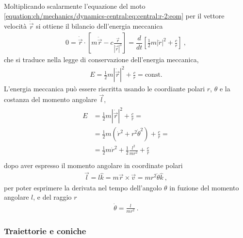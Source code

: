 \documentclass[letterpaper,10pt,italian]{jupyterBook}
\begin{document}
\sphinxAtStartPar
Moltiplicando scalarmente l’equazione del moto \eqref{equation:ch/mechanics/dynamics-central:eq:central:r-2:eom} per il vettore velocità \(\dot{\vec{r}}\) si ottiene il bilancio dell’energia meccanica
\begin{equation*}
\begin{split}0
 = \dot{\vec{r}} \cdot \left[ m \ddot{\vec{r}} - c \frac{\vec{r}}{|\vec{r}|^3} \right] 
 = \dfrac{d}{dt} \left[ \frac{1}{2} m |\dot{r}|^2 + \frac{c}{r} \right] \ ,
\end{split}
\end{equation*}
\sphinxAtStartPar
che si traduce nella legge di conservazione dell’energia meccanica,
\begin{equation*}
\begin{split}E = \frac{1}{2} m |\dot{\vec{r}}|^2 + \frac{c}{r} = \text{const.}\end{split}
\end{equation*}
\sphinxAtStartPar
L’energia meccanica può essere riscritta usando le coordiante polari \(r\), \(\theta\) e la costanza del momento angolare \(\vec{l}\),
\begin{equation}\label{equation:ch/mechanics/dynamics-central:eq:dynamics:central:r-2:energy}
\begin{split}\begin{aligned}
 E & = \frac{1}{2} m |\dot{\vec{r}}|^2 + \frac{c}{r} = \\
   & = \frac{1}{2} m \left( \dot{r}^2 + r^2 \dot{\theta}^2 \right) + \frac{c}{r} = \\
   & = \frac{1}{2} m \dot{r}^2 + \frac{1}{2} \frac{l^2}{m r^2} + \frac{c}{r} \\
\end{aligned}\end{split}
\end{equation}
\sphinxAtStartPar
dopo aver espresso il momento angolare in coordinate polari
\begin{equation*}
\begin{split}\vec{l} = l \hat{k} = m \vec{r} \times \vec{v} = m r^2 \dot{\theta} \hat{k} \ ,\end{split}
\end{equation*}
\sphinxAtStartPar
per poter esprimere la derivata nel tempo dell’angolo \(\theta\) in fuzione del momento angolare \(l\), e del raggio \(r\)
\begin{equation}\label{equation:ch/mechanics/dynamics-central:eq:theta-ang-mom}
\begin{split}\dot{\theta} = \frac{l}{m r^2} \ .\end{split}
\end{equation}\label{\detokenize{ch/mechanics/dynamics-central:physics-hs-mechanics-dynamics-motion-central-trajectory}}\subsubsection*{Traiettorie e coniche}
\end{document}
